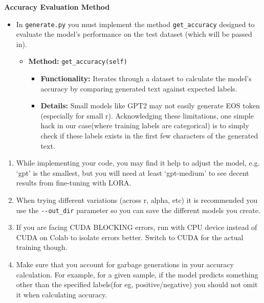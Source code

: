 \documentclass[11pt,addpoints,answers]{exam}
\begin{document}
\begin{questions}
\textbf{Accuracy Evaluation Method}

\begin{itemize}
    \item 
In \texttt{generate.py} you must implement the method \texttt{get\_accuracy} designed to evaluate the model's performance on the test dataset (which will be passed in).

\begin{itemize}
    \item \textbf{Method:} \texttt{get\_accuracy(self)}
        \begin{itemize}
            \item \textbf{Functionality:} Iterates through a dataset to calculate the model's accuracy by comparing generated text against expected labels.
    
            \item \textbf{Details:} Small models like GPT2 may not easily generate EOS token (especially for small r). Acknowledging these limitations, one simple hack in our case(where training labels are categorical) is to simply check if these labels exists in the first few characters of the generated text. 
        \end{itemize}
        
    \end{itemize}

\end{itemize}
    
\begin{enumerate}
    \item While implementing your code, you may find it help to adjust the model, e.g. `gpt' is the smallest, but you will need at least `gpt-medium' to see decent results from fine-tuning with LORA.
    \item When trying different variations (across r, alpha, etc) it is recommended you use the \lstinline{--out_dir}  
 parameter so you can save the different models you create. 
    \item If you are facing CUDA BLOCKING errors, run with CPU device instead of CUDA on Colab to isolate errors better. Switch to CUDA for the actual training though. 
    \item Make sure that you account for garbage generations in your accuracy calculation. For example, for a given sample, if the model predicts something other than the specified labels(for eg, positive/negative) you should not omit it when calculating accuracy.
\end{enumerate}
\clearpage


\end{questions}
\end{document}
